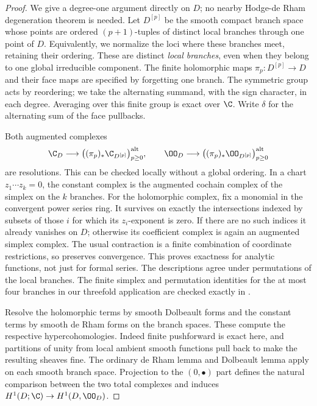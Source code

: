 \begin{proof}
We give a degree-one argument directly on $D$; no nearby
Hodge-de Rham degeneration theorem is needed. Let
$D^{[p]}$ be the smooth compact branch space whose points are
ordered $(p+1)$-tuples of distinct local branches through one
point of $D$. Equivalently, we normalize the loci where these
branches meet, retaining their ordering. These are distinct
\emph{local branches}, even when they belong to one global
irreducible component. The finite holomorphic maps
$\pi_p:D^{[p]}\to D$ and their face maps are specified by
forgetting one branch. The symmetric group acts by reordering;
we take the alternating summand, with the sign character, in
each degree. Averaging over this finite group is exact over
$\C$. Write $\delta$ for the alternating sum of the face
pullbacks.

Both augmented complexes
\[
 \C_D\longrightarrow
 \bigl((\pi_p)_*\C_{D^{[p]}}\bigr)_{p\geq0}^{\mathrm{alt}},
 \qquad
 \OO_D\longrightarrow
 \bigl((\pi_p)_*\OO_{D^{[p]}}\bigr)_{p\geq0}^{\mathrm{alt}}
\]
are resolutions. This can be checked locally without a global
ordering. In a chart $z_1\cdots z_k=0$, the constant complex is
the augmented cochain complex of the simplex on the $k$ branches.
For the holomorphic complex, fix a monomial in the convergent
power series ring. It survives on exactly the intersections
indexed by subsets of those $i$ for which its $z_i$-exponent is
zero. If there are no such indices it already vanishes on $D$;
otherwise its coefficient complex is again an augmented simplex
complex. The usual contraction is a finite combination of
coordinate restrictions, so preserves convergence. This proves
exactness for analytic functions, not just for formal series.
The descriptions agree under permutations of the local branches.
The finite simplex and permutation identities for the at most
four branches in our threefold application are checked exactly
in .

Resolve the holomorphic terms by smooth Dolbeault forms and
the constant terms by smooth de Rham forms on the branch spaces.
These compute the respective hypercohomologies. Indeed finite
pushforward is exact here, and partitions of unity from local
ambient smooth functions pull back to make the resulting sheaves
fine. The ordinary de Rham lemma and Dolbeault lemma apply on
each smooth branch space. Projection to the $(0,\bullet)$
part defines the natural comparison between the two total
complexes and induces $H^1(D;\C)\to H^1(D,\OO_D)$.


\end{proof}
